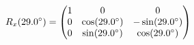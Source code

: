 \documentclass[preview]{standalone}
\begin{document}
\begin{align*}
\special{dvisvgm:raw <g id='unique000'>}R_x(29.0^\circ) = \begin{pmatrix} 1 & 0 & 0 \\ 0 & \cos(29.0^\circ) & -\sin(29.0^\circ) \\ 0 & \sin(29.0^\circ) & \cos(29.0^\circ) \end{pmatrix}\special{dvisvgm:raw </g>}
\end{align*}
\end{document}
